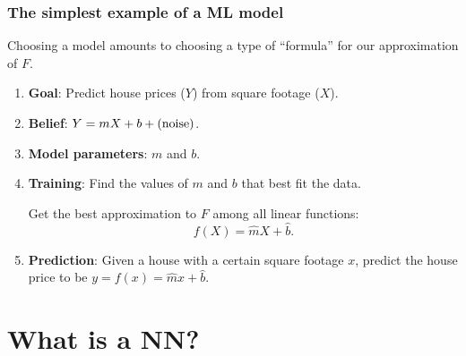 \documentclass{beamer}
\theoremstyle{definition}
\begin{document}
 \frame%
{\frametitle{The simplest example of a ML model}

Choosing a model amounts to choosing a type of ``formula'' for our approximation of $F$.

\begin{example}
\begin{enumerate}[$\bullet$]
    \item \textbf{Goal}: Predict house prices ($Y$) from square footage ($X$). \pause
    \item \textbf{Belief}: $Y = m X + b + \textup{(noise)}$. \pause
    \item \textbf{Model parameters}: $m$ and $b$. \pause
    \item \textbf{Training}: Find the values of $m$ and $b$ that best fit the data. \pause 
    
    Get the best approximation to $F$ among all linear functions: 
    \begin{equation*}
        f(X) = \hat{m} X + \hat{b}.
    \end{equation*} \pause
    \vspace{-0.25in}
    \item \textbf{Prediction}: Given a house with a certain square footage $x$, predict the house price to be $y = f(x) = \hat{m} x + \hat{b}$.
\end{enumerate}
\end{example}
}

\section{What is a NN?}
\end{document}
